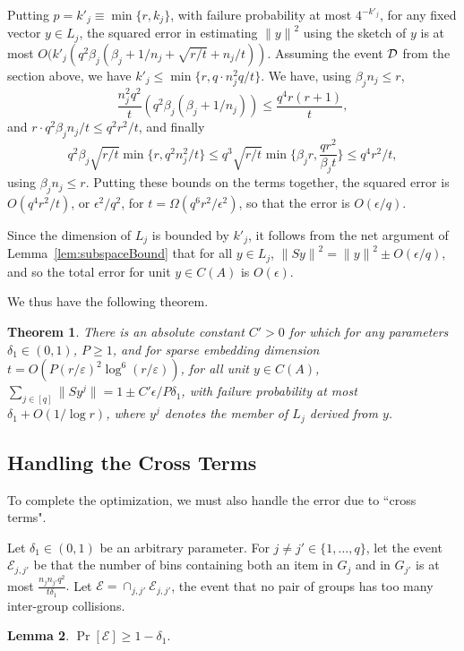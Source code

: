 \documentclass{sig-alternate}
\newcommand{\norm}[1]{{\| #1 \|}}
\newcommand{\eps}{\varepsilon}
\newtheorem{theorem}{Theorem}
\newtheorem{lemma}[theorem]{Lemma}
\begin{document}
Putting $p=k'_j  \equiv \min\{r, k_j\}$, with failure probability at
most $4^{-k'_j}$, 
for any fixed vector $y\in L_j$, the squared error in estimating
$\norm{y}^2$ using the sketch of $y$ is at most
$O(k'_j(q^2\beta_j (\beta_j + 1/n_j + \sqrt{r/t}+ n_j/t))$.
Assuming the event $\cal D$ from the section above,
we have $k'_j\le \min\{r, q \cdot n_j^2q / t \}$. 
We have, using $\beta_j n_j\le r$,
\[
\frac{n_j^2 q^2}{t}(q^2\beta_j (\beta_j + 1/n_j))
	\le \frac{q^4r(r+1)}{t},
\]
and $r\cdot q^2 \beta_j n_j/t  \le q^2 r^2/t$,
and finally
\[
q^2\beta_j\sqrt{r/t}\min\{r, q^2 n_j^2/t\}
	 \le q^3\sqrt{r/t}\min\{\beta_j r, \frac{q r^2}{\beta_j t}\}
	 \le q^4 r^2/t,
\]
using $\beta_j n_j\le r$.
Putting these bounds on the terms together,
the squared error is $O(q^4r^2/t)$, or $\epsilon^2/q^2$, for
$t=\Omega(q^6r^2/\epsilon^2)$, so that the error is $O(\epsilon/q)$.

Since the dimension of $L_j$
is bounded by $k'_j$, it follows from the net argument of Lemma~\ref{lem:subspaceBound}
that for all $y\in L_j$, $\norm{Sy}^2 = \norm{y}^2 \pm O(\epsilon/q)$,
and so the total error for unit $y\in C(A)$ is $O(\epsilon)$.

We thus have the following theorem. 

\begin{theorem}\label{thm:partition within}
There is an absolute constant $C' > 0$ for which 
for any parameters $\delta_1 \in (0,1)$, $P \geq 1$, and for sparse embedding dimension 
$t = O(P (r/\eps)^2 \log^6(r/\eps))$, for all unit $y\in C(A)$,
$\sum_{j\in [q]} \norm{Sy^j} = 1 \pm C'\epsilon/P\delta_1$,
with failure probability at most $\delta_1 + O(1/\log r)$,
where $y^j$ denotes the member of $L_j$ derived from $y$.
\end{theorem}

\subsection{Handling the Cross Terms}

To complete the optimization, we must also handle the error due to ``cross terms".

Let $\delta_1 \in (0,1)$ be an arbitrary parameter. 
For $j \neq j' \in \{1, \ldots, q\}$, let the event 
$\mathcal{E}_{j,j'}$ be that the number of bins containing both an item in $G_j$
and in $G_{j'}$ is at most $\frac{n_j n_{j'} q^2}{t \delta_1}.$
Let $\mathcal{E} = \cap_{j, j'} \mathcal{E}_{j,j'}$, the
event that no pair of groups has too many inter-group collisions.
\begin{lemma}\label{lem:E}
$\Pr[\mathcal{E}] \geq 1 - \delta_1.$
\end{lemma}
\end{document}
